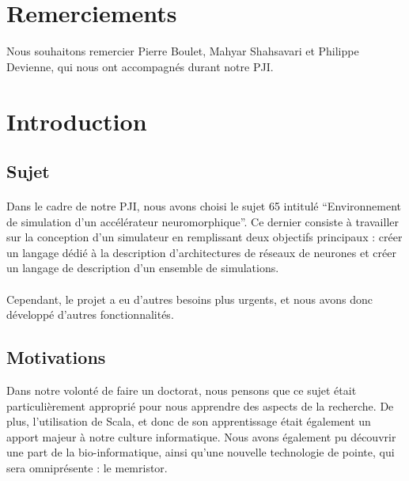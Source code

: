 \documentclass[a4paper,10pt]{article}
\begin{document}
\section*{Remerciements}

Nous souhaitons remercier Pierre Boulet, Mahyar Shahsavari et Philippe Devienne, qui nous ont accompagnés durant notre PJI.

\newpage


\tableofcontents

\newpage


\section*{Introduction}

\subsection*{Sujet} 

\paragraph{}
Dans le cadre de notre PJI, nous avons choisi le sujet 65 intitulé \enquote{Environnement de simulation d'un accélérateur neuromorphique}. Ce dernier consiste à travailler sur la conception d'un simulateur en remplissant deux objectifs principaux : créer un langage dédié à la description d'architectures de réseaux de neurones et créer un langage de description d'un ensemble de simulations.

\paragraph{}
Cependant, le projet a eu d’autres besoins plus urgents, et nous avons donc développé d'autres fonctionnalités.

\subsection*{Motivations}
Dans notre volonté de faire un doctorat, nous pensons que ce sujet était particulièrement approprié pour nous apprendre des aspects de la recherche. De plus, l’utilisation de Scala, et donc de son apprentissage était également un apport majeur à notre culture informatique. Nous avons également pu découvrir une part de la bio-informatique, ainsi qu'une nouvelle technologie de pointe, qui sera omniprésente : le memristor.
\end{document}
